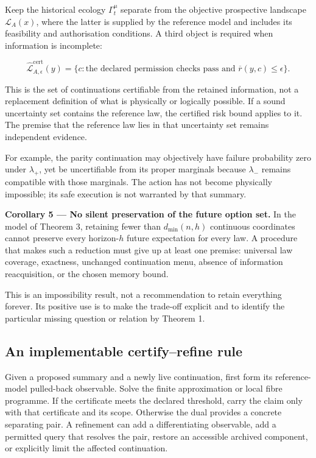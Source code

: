 \documentclass[11pt,a4paper]{article}
\begin{document}
Keep the historical ecology \(\Gamma_t^\mu\) separate from the objective
prospective landscape \(\mathcal L_A(x)\), where the latter is supplied
by the reference model and includes its feasibility and authorisation
conditions. A third object is required when information is incomplete:

\nopagebreak[4]

\[
\widehat{\mathcal L}^{\mathrm{cert}}_{A,\epsilon}(y)
 =\{c:\text{the declared permission checks pass and }
                     \overline r(y,c)\le\epsilon\}.
\]

This is the set of continuations certifiable from the retained
information, not a replacement definition of what is physically or
logically possible. If a sound uncertainty set contains the reference
law, the certified risk bound applies to it. The premise that the
reference law lies in that uncertainty set remains independent evidence.

For example, the parity continuation may objectively have failure
probability zero under \(\lambda_+\), yet be uncertifiable from its
proper marginals because \(\lambda_-\) remains compatible with those
marginals. The action has not become physically impossible; its safe
execution is not warranted by that summary.


\textbf{Corollary 5 --- No silent preservation of the future option
set.} In the model of Theorem 3, retaining fewer than \(d_{\min}(n,h)\)
continuous coordinates cannot preserve every horizon-\(h\) future
expectation for every law. A procedure that makes such a reduction must
give up at least one premise: universal law coverage, exactness,
unchanged continuation menu, absence of information reacquisition, or
the chosen memory bound.

This is an impossibility result, not a recommendation to retain
everything forever. Its positive use is to make the trade-off explicit
and to identify the particular missing question or relation by Theorem
1.

\subsection{An implementable certify--refine
rule}\label{an-implementable-certifyrefine-rule}

Given a proposed summary and a newly live continuation, first form its
reference-model pulled-back observable. Solve the finite approximation
or local fibre programme. If the certificate meets the declared
threshold, carry the claim only with that certificate and its scope.
Otherwise the dual provides a concrete separating pair. A refinement can
add a differentiating observable, add a permitted query that resolves
the pair, restore an accessible archived component, or explicitly limit
the affected continuation.
\end{document}
